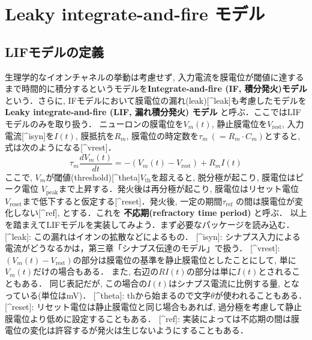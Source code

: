 \section{Leaky integrate-and-fire モデル}\subsection{LIFモデルの定義}生理学的なイオンチャネルの挙動は考慮せず, 入力電流を膜電位が閾値に達するまで時間的に積分するというモデルを\textbf{Integrate-and-fire (IF, 積分発火)モデル} という．さらに, IFモデルにおいて膜電位の漏れ(leak)[^leak]も考慮したモデルを \textbf{Leaky integrate-and-fire (LIF, 漏れ積分発火) モデル} と呼ぶ．ここではLIFモデルのみを取り扱う．
ニューロンの膜電位を$V_m(t)$, 静止膜電位を$V_\text{rest}$, 入力電流[^isyn]を$I(t)$, 膜抵抗を$R_m$, 膜電位の時定数を$\tau_m\ (=R_m \cdot C_m)$とすると, 式は次のようになる[^vrest]．
$$
\begin{equation}
\tau_m \frac{dV_{m}(t)}{dt}=-(V_{m}(t)-V_\text{rest})+R_mI(t)
\end{equation}
$$
ここで, $V_m$が閾値(threshold)[^theta]$V_{\text{th}}$を超えると, 脱分極が起こり, 膜電位はピーク電位 $V_{\text{peak}}$まで上昇する．発火後は再分極が起こり, 膜電位はリセット電位 $V_{\text{reset}}$まで低下すると仮定する[^reset]．発火後, 一定の期間$\tau_{\text{ref}}$ の間は膜電位が変化しない[^ref], とする．これを \textbf{不応期(refractory time period)} と呼ぶ．
以上を踏まえてLIFモデルを実装してみよう．まず必要なパッケージを読み込む．
[^leak]: この漏れはイオンの拡散などによるもの． 
[^isyn]: シナプス入力による電流がどうなるかは，第三章「シナプス伝達のモデル」で扱う．
[^vrest]: $(V_{m}(t)-V_\text{rest})$の部分は膜電位の基準を静止膜電位としたことにして, 単に$V_m(t)$だけの場合もある． また, 右辺の$RI(t)$の部分は単に$I(t)$とされることもある． 同じ表記だが, この場合の$I(t)$はシナプス電流に比例する量, となっている(単位はmV)． 
[^theta]: thから始まるので文字$\theta$が使われることもある．
[^reset]: リセット電位は静止膜電位と同じ場合もあれば, 過分極を考慮して静止膜電位より低めに設定することもある．
[^ref]: 実装によっては不応期の間は膜電位の変化は許容するが発火は生じないようにすることもある．